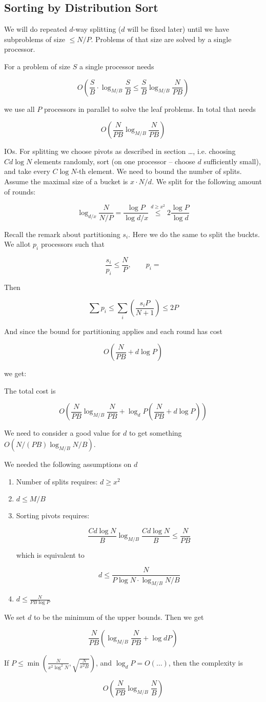 \subsection{Sorting by Distribution Sort}

We will do repeated $d$-way splitting ($d$ will be fixed later) until we have subproblems of size $\leq N/P$. Problems of that size are solved by a single processor.

For a problem of size $S$ a single processor needs 

\[O(\frac SB \cdot \log_{M/B}\frac SB \leq \frac SB \log_{M/B} \frac{N}{PB})\]

we use all $P$ processors in parallel to solve the leaf problems. In total that needs 

\[O(\frac{N}{PB} \log_{M/B} \frac{N}{PB})\]

IOs. For splitting we choose pivots as described in section \ldots, i.e. choosing $Cd\log N$ elements randomly, sort (on one processor -- choose $d$ sufficiently small), and take every $C\log N$-th element. We need to bound the number of splits. Assume the maximal size of a bucket is $x\cdot N/d$. We split for the following amount of rounds:

\[\log_{d/x} \frac{N}{N/P} = \frac{\log P}{\log d/x} \stackrel{{d\geq x^2}}{\leq} 2\frac{\log P}{\log d}\]

Recall the remark about partitioning $s_i$. Here we do the same to split the buckts. We allot $p_i$ processors such that

\[\frac{s_i}{p_i} \leq \frac NP, \qquad p_i = \]

Then 

\[\sum p_i \leq \sum_i (\frac{s_iP}{N +1}) \leq 2P\]

And since the bound for partitioning applies and each round has cost 

\[O(\frac{N}{PB} + d\log P)\]

we get:

\begin{thm} The total cost is 

\[O(\frac{N}{PB} \log _{M/B} \frac{N}{PB} + \log_dP (\frac{N}{PB} + d\log P))\]\end{thm}

We need to consider a good value for $d$ to get something $O(N/(PB) \log _{M/B}N/B)$.


We needed the following assumptions on $d$
\begin{enumerate}
\item Number of splits requires: $d\geq x^2$
\item $d\leq M/B$
\item Sorting pivots requires: 

\[\frac{Cd\log N}{B} \log _{M/B} \frac{Cd\log N}{B} \leq \frac{N}{PB}\]

which is equivalent to

\[d\leq \frac{N}{P\log N \cdot \log_{M/B} N/B}\]
\item $d\leq \frac{N}{PB \log P}$
\end{enumerate}

We set $d$ to be the minimum of the upper bounds. Then we get

\[\frac{N}{PB}(\log_{M/B} \frac{N}{PB} + \log d P)\]

\begin{thm} If $P\leq \min(\frac{N}{x^2\log^2N}, \sqrt{\frac{N}{x^2B}})$, and $\log_d P = O(\ldots)$, then the complexity is 

\[O(\frac{N}{PB} \log_{M/B} \frac{N}{B})\]
\end{thm}